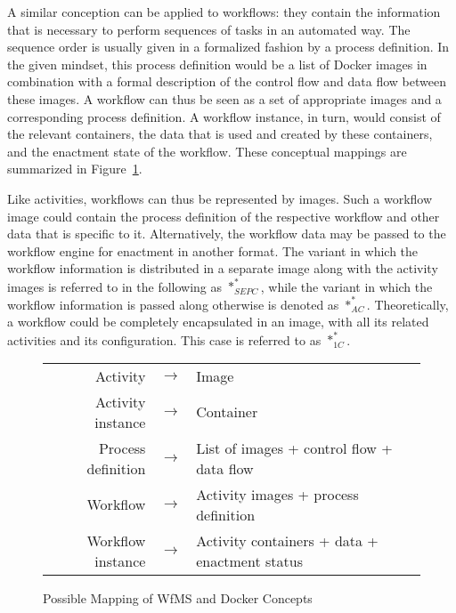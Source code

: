     A similar conception can be applied to workflows: they contain the information that is necessary to perform sequences of tasks in an automated way. The sequence order is usually given in a formalized fashion by a process definition. In the given mindset, this process definition would be a list of Docker images in combination with a formal description of the control flow and data flow between these images. A workflow can thus be seen as a set of appropriate images and a corresponding process definition.
    A workflow instance, in turn, would consist of the relevant containers, the data that is used and created by these containers, and the enactment state of the workflow. These conceptual mappings are summarized in Figure~\ref{fig:conceptual_correspondence_between_wfms_and_docker_entities}.

    Like activities, workflows can thus be represented by images. Such a workflow image could contain the process definition of the respective workflow and other data that is specific to it. Alternatively, the workflow data may be passed to the workflow engine for enactment in another format.
    The variant in which the workflow information is distributed in a separate image along with the activity images is referred to in the following as $*_{SEPC}^{*}$, while the variant in which the workflow information is passed along otherwise is denoted as $*_{AC}^{*}$.
    Theoretically, a workflow could be completely encapsulated in an image, \ie with all its related activities and its configuration. This case is referred to as $*_{1C}^*$.

    \begin{figure}[htbp]
      \centering
        \begin{tabular}{r c l}
          \toprule
          Activity           & $\rightarrow$ & Image\\
          Activity instance  & $\rightarrow$ & Container\\
          Process definition & $\rightarrow$ & List of images + control flow + data flow\\
          Workflow           & $\rightarrow$ & Activity images + process definition\\
          Workflow instance  & $\rightarrow$ & Activity containers + data + enactment status\\
          \bottomrule
        \end{tabular}
      \caption{Possible Mapping of WfMS and Docker Concepts}
      \label{fig:conceptual_correspondence_between_wfms_and_docker_entities}
    \end{figure}

